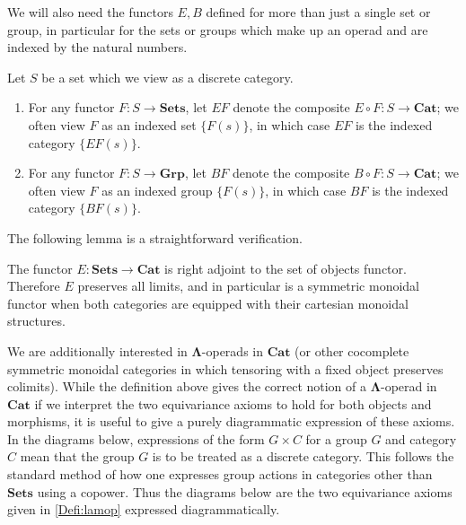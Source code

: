 \documentclass{amsbook} %
\newcommand{\mb}{\mathbf}
\numberwithin{section}{chapter}
\begin{document}
We will also need the functors $E, B$ defined for more than just a single set or group, in particular for the sets or groups which make up an operad and are indexed by the natural numbers.

\begin{nota}\label{nota:e_b}
Let $S$ be a set which we view as a discrete category.
\begin{enumerate}
\item For any functor $F \colon S \rightarrow \mb{Sets}$, let $EF$ denote the composite $E \circ F \colon S \rightarrow \mb{Cat}$; we often view $F$ as an indexed set $\{ F(s) \}$, in which case $EF$ is the indexed category $\{ EF(s) \}$.
\item For any functor $F \colon S \rightarrow \mb{Grp}$, let $BF$ denote the composite $B \circ F \colon S \rightarrow \mb{Cat}$; we often view $F$ as an indexed group $\{ F(s) \}$, in which case $BF$ is the indexed category $\{ BF(s) \}$.
\end{enumerate}
\end{nota}

The following lemma is a straightforward verification.

\begin{lem}\label{symmoncor}
The functor $E \colon \mb{Sets} \rightarrow \mb{Cat}$ is right adjoint to the set of objects functor.  Therefore $E$ preserves all limits, and in particular is a symmetric monoidal functor when both categories are equipped with their cartesian monoidal structures.
\end{lem}

We are additionally interested in $\mb{\Lambda}$-operads in $\mb{Cat}$ (or other cocomplete symmetric monoidal categories in which tensoring with a fixed object preserves colimits).  While the definition above gives the correct notion of a $\mb{\Lambda}$-operad in $\mb{Cat}$ if we interpret the two equivariance axioms to hold for both objects and morphisms, it is useful to give a purely diagrammatic expression of these axioms.  In the diagrams below, expressions of the form $G \times C$ for a group $G$ and category $C$ mean that the group $G$ is to be treated as a discrete category.  This follows the standard method of how one expresses group actions in categories other than $\mb{Sets}$ using a copower.  Thus the diagrams below are the two equivariance axioms given in \cref{Defi:lamop} expressed diagrammatically.
\end{document}
